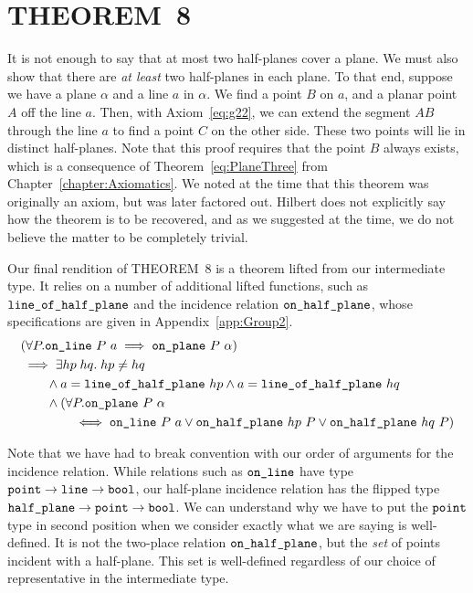 \section{THEOREM~8}
It is not enough to say that at most two half-planes cover a plane. We must also show that there are \emph{at least} two half-planes in each plane. To that end, suppose we have a plane $\alpha$ and a line $a$ in $\alpha$. We find a  point $B$ on $a$, and a planar point $A$ off the line $a$. Then, with Axiom~\ref{eq:g22}, we can extend the segment $AB$ through the line $a$ to find a point $C$ on the other side. These two points will lie in distinct half-planes. Note that this proof requires that the point $B$ always exists, which is a consequence of Theorem~\ref{eq:PlaneThree} from Chapter~\ref{chapter:Axiomatics}. We noted at the time that this theorem was originally an axiom, but was later factored out. Hilbert does not explicitly say how the theorem is to be recovered, and as we suggested at the time, we do not believe the matter to be completely trivial.

Our final rendition of THEOREM~8 is a theorem lifted from our intermediate type. It relies on a number of additional lifted functions, such as $\texttt{line\_of\_half\_plane}$ and the incidence relation $\texttt{on\_half\_plane}$, whose specifications are given in Appendix~\ref{app:Group2}. 
\begin{equation}\label{eq:HalfPlaneCover}
  \begin{split}
    &(\forall P. \code{on\_line}\ P\ a \implies \code{on\_plane}\ P\ \alpha)\\
    &\implies \exists hp\; hq.\; hp \neq hq\\
    &\qquad \wedge a = \code{line\_of\_half\_plane}\ hp \wedge a = \code{line\_of\_half\_plane}\ hq\\
    &\qquad \wedge (\forall P. \code{on\_plane}\ P\ \alpha\\
    &\qquad\qquad \iff \code{on\_line}\ P\ a \vee \code{on\_half\_plane}\ hp\ P \vee \code{on\_half\_plane}\ hq\ P)
  \end{split}
\end{equation}

Note that we have had to break convention with our order of arguments for the incidence relation. While relations such as $\texttt{on\_line}$ have type $\texttt{point}\rightarrow\texttt{line}\rightarrow\texttt{bool}$, our half-plane incidence relation has the flipped type $\texttt{half\_plane}\rightarrow\texttt{point}\rightarrow\texttt{bool}$. We can understand why we have to put the $\texttt{point}$ type in second position when we consider exactly what we are saying is well-defined. It is not the two-place relation $\texttt{on\_half\_plane}$, but the \emph{set} of points incident with a half-plane. This set is well-defined regardless of our choice of representative in the intermediate type.

